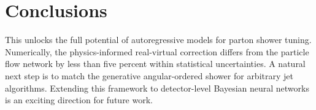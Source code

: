 \section{Conclusions}\label{sec:conclusions}

This unlocks the full potential of autoregressive models for parton
shower tuning. Numerically, the physics-informed real-virtual correction
differs from the particle flow network by less than five percent within
statistical uncertainties. A natural next step is to match the
generative angular-ordered shower for arbitrary jet algorithms.
Extending this framework to detector-level Bayesian neural networks is
an exciting direction for future work.

